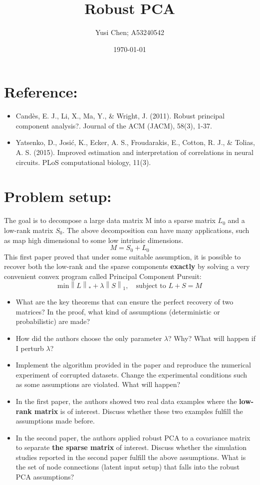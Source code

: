 \documentclass[12pt]{extarticle}
\title{Robust PCA}
\author{Yusi Chen; A53240542}
\date{\today}
\newcommand{\<}{\langle}
\renewcommand{\>}{\rangle}
\theoremstyle{definition}
\newcommand{\norm}[1]{\left\lVert#1\right\rVert}
\begin{document}
\maketitle

\section{Reference:}
\begin{itemize}
    \item Candès, E. J., Li, X., Ma, Y., & Wright, J. (2011). Robust principal component analysis?. Journal of the ACM (JACM), 58(3), 1-37.
    \item Yatsenko, D., Josić, K., Ecker, A. S., Froudarakis, E., Cotton, R. J., & Tolias, A. S. (2015). Improved estimation and interpretation of correlations in neural circuits. PLoS computational biology, 11(3).
\end{itemize}

\section{Problem setup:}
The goal is to decompose a large data matrix M into a sparse matrix $L_0$ and a low-rank matrix $S_0$. The above decomposition can have many applications, such as map high dimensional to some low intrinsic dimensions. 
\begin{equation}
    M = S_0 + L_0
\end{equation}
This first paper proved that under some suitable assumption, it is possible to recover both the low-rank and the sparse components \textbf{exactly} by solving a very convenient convex program called Principal Component Pursuit:
\begin{equation}
    \text{min} \norm{L}_* + \lambda \norm{S}_1, \quad\text{subject to } L+S = M
\end{equation}

\begin{itemize}
    \item What are the key theorems that can ensure the perfect recovery of two matrices? In the proof, what kind of assumptions (deterministic or probabilistic) are made?
    \item How did the authors choose the only parameter $\lambda$? Why? What will happen if I perturb $\lambda$? 
    \item Implement the algorithm provided in the paper and reproduce the numerical experiment of corrupted datasets. Change the experimental conditions such as some assumptions are violated. What will happen?  
    \item In the first paper, the authors showed two real data examples where the \textbf{low-rank matrix} is of interest. Discuss whether these two examples fulfill the assumptions made before. 
    \item In the second paper, the authors applied robust PCA to a covariance matrix to separate \textbf{the sparse matrix} of interest. Discuss whether the simulation studies reported in the second paper fulfill the above assumptions. What is the set of node connections (latent input setup) that falls into the robust PCA assumptions?
\end{itemize}
\end{document}
